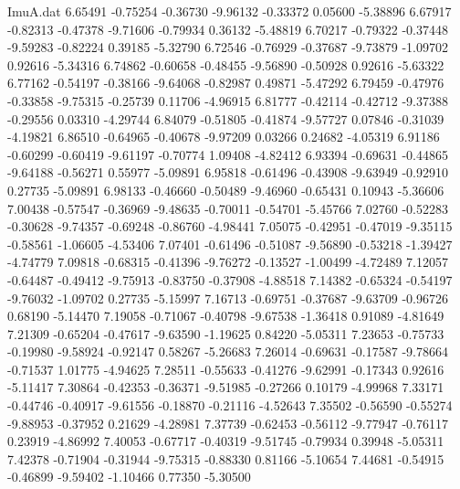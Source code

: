 \begin{filecontents}{ImuA.dat}
   6.65491   -0.75254   -0.36730   -9.96132   -0.33372    0.05600   -5.38896
   6.67917   -0.82313   -0.47378   -9.71606   -0.79934    0.36132   -5.48819
   6.70217   -0.79322   -0.37448   -9.59283   -0.82224    0.39185   -5.32790
   6.72546   -0.76929   -0.37687   -9.73879   -1.09702    0.92616   -5.34316
   6.74862   -0.60658   -0.48455   -9.56890   -0.50928    0.92616   -5.63322
   6.77162   -0.54197   -0.38166   -9.64068   -0.82987    0.49871   -5.47292
   6.79459   -0.47976   -0.33858   -9.75315   -0.25739    0.11706   -4.96915
   6.81777   -0.42114   -0.42712   -9.37388   -0.29556    0.03310   -4.29744
   6.84079   -0.51805   -0.41874   -9.57727    0.07846   -0.31039   -4.19821
   6.86510   -0.64965   -0.40678   -9.97209    0.03266    0.24682   -4.05319
   6.91186   -0.60299   -0.60419   -9.61197   -0.70774    1.09408   -4.82412
   6.93394   -0.69631   -0.44865   -9.64188   -0.56271    0.55977   -5.09891
   6.95818   -0.61496   -0.43908   -9.63949   -0.92910    0.27735   -5.09891
   6.98133   -0.46660   -0.50489   -9.46960   -0.65431    0.10943   -5.36606
   7.00438   -0.57547   -0.36969   -9.48635   -0.70011   -0.54701   -5.45766
   7.02760   -0.52283   -0.30628   -9.74357   -0.69248   -0.86760   -4.98441
   7.05075   -0.42951   -0.47019   -9.35115   -0.58561   -1.06605   -4.53406
   7.07401   -0.61496   -0.51087   -9.56890   -0.53218   -1.39427   -4.74779
   7.09818   -0.68315   -0.41396   -9.76272   -0.13527   -1.00499   -4.72489
   7.12057   -0.64487   -0.49412   -9.75913   -0.83750   -0.37908   -4.88518
   7.14382   -0.65324   -0.54197   -9.76032   -1.09702    0.27735   -5.15997
   7.16713   -0.69751   -0.37687   -9.63709   -0.96726    0.68190   -5.14470
   7.19058   -0.71067   -0.40798   -9.67538   -1.36418    0.91089   -4.81649
   7.21309   -0.65204   -0.47617   -9.63590   -1.19625    0.84220   -5.05311
   7.23653   -0.75733   -0.19980   -9.58924   -0.92147    0.58267   -5.26683
   7.26014   -0.69631   -0.17587   -9.78664   -0.71537    1.01775   -4.94625
   7.28511   -0.55633   -0.41276   -9.62991   -0.17343    0.92616   -5.11417
   7.30864   -0.42353   -0.36371   -9.51985   -0.27266    0.10179   -4.99968
   7.33171   -0.44746   -0.40917   -9.61556   -0.18870   -0.21116   -4.52643
   7.35502   -0.56590   -0.55274   -9.88953   -0.37952    0.21629   -4.28981
   7.37739   -0.62453   -0.56112   -9.77947   -0.76117    0.23919   -4.86992
   7.40053   -0.67717   -0.40319   -9.51745   -0.79934    0.39948   -5.05311
   7.42378   -0.71904   -0.31944   -9.75315   -0.88330    0.81166   -5.10654
   7.44681   -0.54915   -0.46899   -9.59402   -1.10466    0.77350   -5.30500

\end{filecontents}
